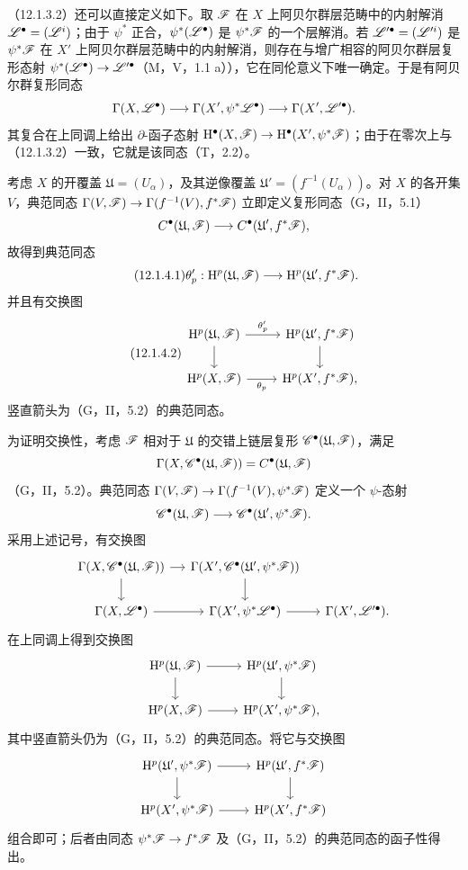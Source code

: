 （12.1.3.2）还可以直接定义如下。取 $\mathscr F$ 在 $X$ 上阿贝尔群层范畴中的内射解消 $\mathscr L^\bullet=(\mathscr L^i)$；由于 $\psi^*$ 正合，$\psi^*(\mathscr L^\bullet)$ 是 $\psi^*\mathscr F$ 的一个层解消。若 $\mathscr L'^\bullet=(\mathscr L'^i)$ 是 $\psi^*\mathscr F$ 在 $X'$ 上阿贝尔群层范畴中的内射解消，则存在与增广相容的阿贝尔群层复形态射 $\psi^*(\mathscr L^\bullet)\to\mathscr L'^\bullet$（M，V，1.1 a）），它在同伦意义下唯一确定。于是有阿贝尔群复形同态
\[
\Gamma(X,\mathscr L^\bullet)\longrightarrow\Gamma(X',\psi^*\mathscr L^\bullet)
\longrightarrow\Gamma(X',\mathscr L'^\bullet).
\]
其复合在上同调上给出 $\partial$-函子态射 $\mathrm H^\bullet(X,\mathscr F)\to\mathrm H^\bullet(X',\psi^*\mathscr F)$；由于在零次上与（12.1.3.2）一致，它就是该同态（T，2.2）。

考虑 $X$ 的开覆盖 $\mathfrak U=(U_\alpha)$，及其逆像覆盖 $\mathfrak U'=(f^{-1}(U_\alpha))$。对 $X$ 的各开集 $V$，典范同态 $\Gamma(V,\mathscr F)\to\Gamma(f^{-1}(V),f^*\mathscr F)$ 立即定义复形同态（G，II，5.1）
\[
C^\bullet(\mathfrak U,\mathscr F)\longrightarrow C^\bullet(\mathfrak U',f^*\mathscr F),
\]
故得到典范同态
\begin{equation}\tag{12.1.4.1}
\theta'_p:\mathrm H^p(\mathfrak U,\mathscr F)\longrightarrow\mathrm H^p(\mathfrak U',f^*\mathscr F).
\end{equation}
并且有交换图
\begin{equation}\tag{12.1.4.2}
\begin{tikzcd}
\mathrm H^p(\mathfrak U,\F)\arrow[r,"\theta'_p"]\arrow[d]&\mathrm H^p(\mathfrak U',f^*\F)\arrow[d]\\
\mathrm H^p(X,\F)\arrow[r,"\theta_p"']&\mathrm H^p(X',f^*\F),
\end{tikzcd}
\end{equation}
竖直箭头为（G，II，5.2）的典范同态。

为证明交换性，考虑 $\mathscr F$ 相对于 $\mathfrak U$ 的交错上链层复形 $\mathscr C^\bullet(\mathfrak U,\mathscr F)$，满足
\[
\Gamma(X,\mathscr C^\bullet(\mathfrak U,\mathscr F))=C^\bullet(\mathfrak U,\mathscr F)
\]
（G，II，5.2）。典范同态 $\Gamma(V,\mathscr F)\to\Gamma(f^{-1}(V),\psi^*\mathscr F)$ 定义一个 $\psi$-态射
\[
\mathscr C^\bullet(\mathfrak U,\mathscr F)\longrightarrow\mathscr C^\bullet(\mathfrak U',\psi^*\mathscr F).
\]
采用上述记号，有交换图
\[
\begin{tikzcd}[column sep=small]
\Gamma(X,\C^\bullet(\mathfrak U,\F))\arrow[r]\arrow[d]&\Gamma(X',\C^\bullet(\mathfrak U',\psi^*\F))\arrow[d]&{}\\
\Gamma(X,\LL^\bullet)\arrow[r]&\Gamma(X',\psi^*\LL^\bullet)\arrow[r]&\Gamma(X',\LL'^\bullet).
\end{tikzcd}
\]
在上同调上得到交换图
\[
\begin{tikzcd}
\mathrm H^p(\mathfrak U,\F)\arrow[r]\arrow[d]&\mathrm H^p(\mathfrak U',\psi^*\F)\arrow[d]\\
\mathrm H^p(X,\F)\arrow[r]&\mathrm H^p(X',\psi^*\F),
\end{tikzcd}
\]
其中竖直箭头仍为（G，II，5.2）的典范同态。将它与交换图
\[
\begin{tikzcd}
\mathrm H^p(\mathfrak U',\psi^*\F)\arrow[r]\arrow[d]&\mathrm H^p(\mathfrak U',f^*\F)\arrow[d]\\
\mathrm H^p(X',\psi^*\F)\arrow[r]&\mathrm H^p(X',f^*\F)
\end{tikzcd}
\]
组合即可；后者由同态 $\psi^*\mathscr F\to f^*\mathscr F$ 及（G，II，5.2）的典范同态的函子性得出。

